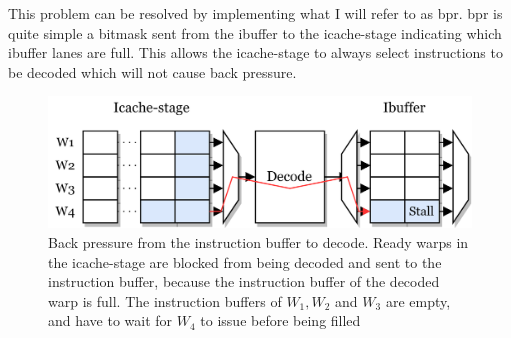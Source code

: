 This problem can be resolved by implementing what I will refer to as \acrfull{bpr}. \acrshort{bpr} is quite simple a bitmask sent from the ibuffer to the icache-stage indicating which ibuffer lanes are full. This allows the icache-stage to always select instructions to be decoded which will not cause back pressure.

\begin{figure}
    \centering
    \includegraphics[width=\textwidth]{figures/backpressure.png}
    \caption[Illustration of back pressure from the ibuffer to the icache-stage.]{Back pressure from the instruction buffer to decode. Ready warps in the icache-stage are blocked from being decoded and sent to the instruction buffer, because the instruction buffer of the decoded warp is full. The instruction buffers of $W_1, W_2$ and $W_3$ are empty, and have to wait for $W_4$ to issue before being filled}
    \label{fig:backpressure}
\end{figure}




